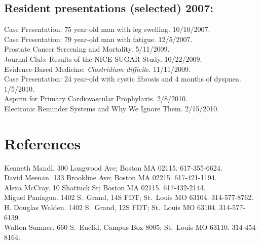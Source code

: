 \documentclass[12pt]{article}
\begin{document}
\subsection*{Resident presentations (selected) 2007:}
Case Presentation: 75 year-old man with leg swelling. 10/10/2007.\\
Case Presentation: 79 year-old man with fatigue. 12/5/2007.\\
Prostate Cancer Screening and Mortality. 5/11/2009.\\
Journal Club: Results of the NICE-SUGAR Study. 10/22/2009.\\
Evidence-Based Medicine: \emph{Clostridium difficile}. 11/11/2009.\\
Case Presentation: 24 year-old with cystic fibrosis and 4 months of
dyspnea. 1/5/2010.\\
Aspirin for Primary Cardiovascular Prophylaxis. 2/8/2010.\\
Electronic Reminder Systems and Why We Ignore Them. 2/15/2010.

\section*{References}
Kenneth Mandl. 300 Longwood Ave; Boston MA 02115. 617-355-6624.\\
David Meenan. 133 Brookline Ave; Boston MA 02215. 617-421-1194.\\
Alexa McCray. 10 Shattuck St; Boston MA 02115. 617-432-2144.\\
Miguel Paniagua. 1402 S.\ Grand, 14S FDT; St.\ Louis MO 63104.
314-577-8762.\\
H. Douglas Walden. 1402 S.\ Grand, 12S FDT; St.\ Louis MO 63104.
314-577-6139.\\
Walton Sumner. 660 S.\ Euclid, Campus Box 8005; St.\ Louis MO 63110.
314-454-8164.
\end{document}
